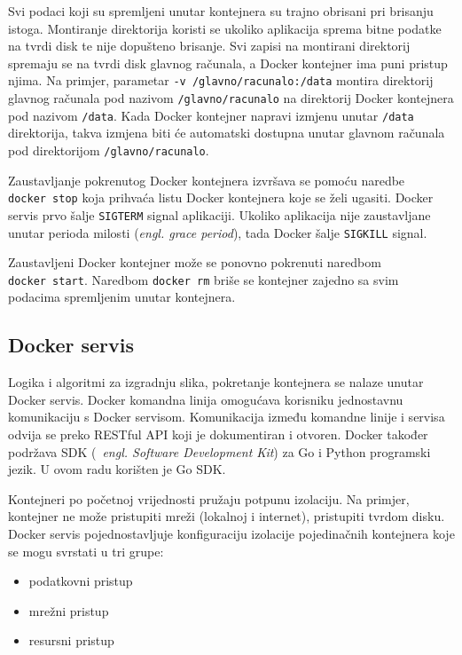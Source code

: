 Svi podaci koji su spremljeni unutar kontejnera su trajno obrisani pri brisanju istoga. Montiranje
direktorija koristi se ukoliko aplikacija sprema bitne podatke na tvrdi disk te nije dopušteno
brisanje. Svi zapisi na montirani direktorij spremaju se na tvrdi disk glavnog računala, a Docker
kontejner ima puni pristup njima. Na primjer, parametar \texttt{-v /glavno/racunalo:/data} montira
direktorij glavnog računala pod nazivom \texttt{/glavno/racunalo} na direktorij Docker kontejnera
pod nazivom \texttt{/data}. Kada Docker kontejner napravi izmjenu unutar \texttt{/data} direktorija,
takva izmjena biti će automatski dostupna unutar glavnom računala pod direktorijom
\texttt{/glavno/racunalo}.

Zaustavljanje pokrenutog Docker kontejnera izvršava se pomoću naredbe \texttt{docker~stop} koja
prihvaća listu Docker kontejnera koje se želi ugasiti. Docker servis prvo šalje \texttt{SIGTERM}
signal aplikaciji. Ukoliko aplikacija nije zaustavljane unutar perioda milosti (\textit{engl. grace
period}), tada Docker šalje \texttt{SIGKILL} signal.

Zaustavljeni Docker kontejner može se ponovno pokrenuti naredbom \texttt{docker~start}. Naredbom
\texttt{docker~rm} briše se kontejner zajedno sa svim podacima spremljenim unutar kontejnera.

\subsection{Docker servis}
Logika i algoritmi za izgradnju slika, pokretanje kontejnera se nalaze unutar Docker servis. Docker
komandna linija omogućava korisniku jednostavnu komunikaciju s Docker servisom. Komunikacija između
komandne linije i servisa odvija se preko RESTful API koji je dokumentiran i otvoren. Docker također
podržava SDK (~\textit{engl. Software Development Kit}) za Go i Python programski jezik. U ovom radu
korišten je Go SDK.

Kontejneri po početnoj vrijednosti pružaju potpunu izolaciju. Na primjer, kontejner ne može
pristupiti mreži (lokalnoj i internet), pristupiti tvrdom disku. Docker servis pojednostavljuje
konfiguraciju izolacije pojedinačnih kontejnera koje se mogu svrstati u tri grupe:
\begin{itemize}
        \item podatkovni pristup
        \item mrežni pristup
        \item resursni pristup
\end{itemize}

